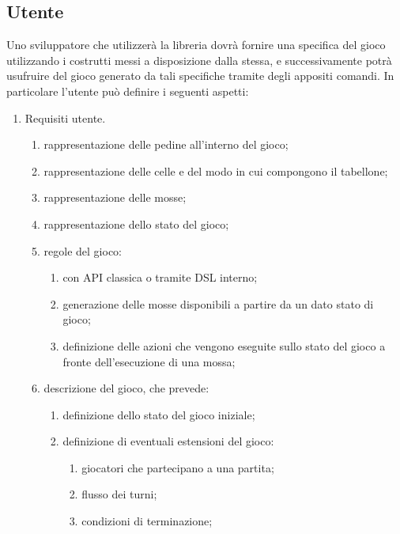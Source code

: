 \subsection{Utente}

Uno sviluppatore che utilizzerà la libreria dovrà fornire una specifica del gioco utilizzando i costrutti messi a disposizione dalla stessa, e successivamente potrà usufruire del gioco generato da tali specifiche tramite degli appositi comandi.
%
In particolare l'utente può definire i seguenti aspetti:
%
\begin{enumerate}[resume]
    \item Requisiti utente.
    \begin{enumerate}[label*=\arabic*.]
        \item rappresentazione delle pedine all'interno del gioco;
        \item rappresentazione delle celle e del modo in cui compongono il tabellone;
        \item rappresentazione delle mosse;
        \item rappresentazione dello stato del gioco;
        \item regole del gioco:
        \begin{enumerate}[label*=\arabic*.]
            \item con API classica o tramite DSL interno;
            \item generazione delle mosse disponibili a partire da un dato stato di gioco;
            \item definizione delle azioni che vengono eseguite sullo stato del gioco a fronte dell'esecuzione di una mossa;
        \end{enumerate}
        \item descrizione del gioco, che prevede:
        \begin{enumerate}[label*=\arabic*.]
            \item definizione dello stato del gioco iniziale;
            \item definizione di eventuali estensioni del gioco:
            \begin{enumerate}[label*=\arabic*.]
                \item giocatori che partecipano a una partita;
                \item flusso dei turni;
                \item condizioni di terminazione;
            \end{enumerate}

\end{enumerate}
\end{enumerate}
\end{enumerate}
